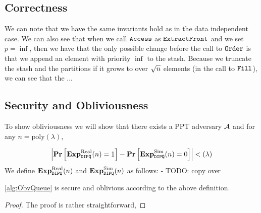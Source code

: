 \subsection{Correctness}
We can note that we have the same invariants hold as in the data independent case.
We can also see that when we call $\texttt{Access}$ as $\texttt{ExtractFront}$ and we set $p = \inf$,
then we have that the only possible change before the call to $\texttt{Order}$ is that we append an element with priority $\inf$ to the stash.
Because we truncate the stash and the partitions if it grows to over ${\sqrt{n}}$ elements (in the call to $\texttt{Fill}$),
we can see that the ...
\subsection{Security and Obliviousness}
To show obliviousness we will show that there exists a PPT
adversary $\mathcal{A}$ and for any $n = \text{poly}(\lambda)$,

\newcommand{\expRealOb}{\experiment_{\DIPQ}^{\text{Real}}(n)}
\newcommand{\expSimOb}{\experiment_{\DIPQ}^{\text{Sim}}(n)}
\begin{equation*}
	\left| \Pr\left[\expRealOb = 1\right] - \Pr\left[\expSimOb = 0\right] \right| < (\lambda)
\end{equation*}
We define $\expRealOb$ and $\expSimOb$ as follows:
- TODO: copy over

\begin{lemma}
	\cref{alg:ObvQueue} is secure and oblivious according to the above definition.
	\begin{proof}
		The proof is rather straightforward, 
		
	\end{proof}
	
\end{lemma}
